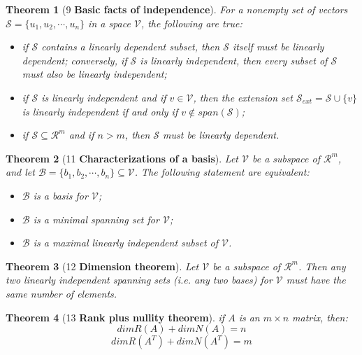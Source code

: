 \documentclass[]{article}
\newtheorem{theo}{Theorem}
\begin{document}
\begin{theo}[9 \textbf{Basic facts of independence}]
For a nonempty set of vectors $\mathcal{S} = \{u_1, u_2,\cdots , u_n\}$ in a space $\mathcal{V}$, the following are true:
\begin{itemize}
\item if $\mathcal{S}$ contains a linearly dependent subset, then $\mathcal{S}$ itself must be linearly dependent; conversely, if $\mathcal{S}$ is linearly independent, then every subset of $\mathcal{S}$ must also be linearly independent;
\item if $\mathcal{S}$ is linearly independent and if $v \in \mathcal{V}$, then the extension set $\mathcal{S}_{ext}=\mathcal{S} \cup \{v\}$ is linearly independent if and only if $v \notin span(\mathcal{S})$;
\item if $\mathcal{S}  \subseteq \mathcal{R}^m$ and if $n > m$, then $\mathcal{S}$ must be linearly dependent.
\end{itemize}
\end{theo}
\begin{theo}[11 \textbf{Characterizations of a basis}]
Let $\mathcal{V}$ be a subspace of $\mathcal{R}^m$, and let $\mathcal{B}=\{b_1,b_2,\cdots ,b_n \}\subseteq \mathcal{V}$. The following statement are equivalent:
\begin{itemize}
\item $\mathcal{B}$ is a basis for $\mathcal{V}$;
\item $\mathcal{B}$ is a minimal spanning set for $\mathcal{V}$;
\item $\mathcal{B}$ is a maximal linearly independent subset of $\mathcal{V}$.
\end{itemize}
\end{theo}
\begin{theo}[12 \textbf{Dimension theorem}]
Let $\mathcal{V}$ be a subspace of $\mathcal{R}^m$. Then any two linearly independent spanning sets (i.e. any two bases) for $\mathcal{V}$ must have the same number of elements.
\end{theo}

\begin{theo}[13 \textbf{Rank plus nullity theorem}]
if $A$ is an $m\times n$ matrix, then:
$$dimR(A)+dimN(A)=n$$
$$dimR(A^T)+dimN(A^T)=m$$
\end{theo}
\end{document}
